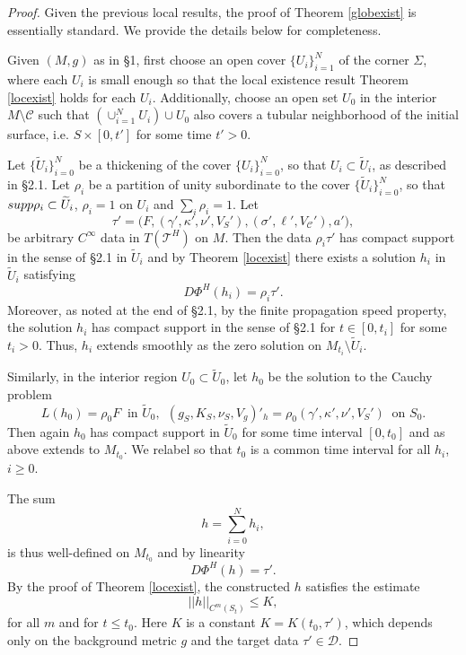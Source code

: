 \documentclass[10pt,a4paper]{amsart}
\newcommand{\Si}{\Sigma}
\newcommand{\be}{\begin{equation}}
\newcommand{\cC}{{\mathcal C}}
\newcommand{\cD}{{\mathcal D}}
\newcommand{\cT}{{\mathcal T}}
\newcommand{\ee}{\end{equation}}
\newcommand{\g}{\gamma}
\renewcommand{\k}{\kappa}
\newcommand{\s}{\sigma}
\newcommand{\w}{\widetilde}
\begin{document}
 \begin{proof}

  Given the previous local results, the proof of Theorem \ref{globexist} is essentially standard. We provide the details below for completeness. 
    
  Given $(M, g)$ as in \S 1, first choose an open cover $\{U_i\}_{i=1}^N$ of the corner $\Si$, where each $U_i$ is small enough so that the local 
existence result Theorem \ref{locexist} holds for each $U_i$. Additionally, choose an open set $U_0$ in the interior $M\setminus \cC$ such that 
$(\cup_{i=1}^N U_i)\cup U_0$ also covers a tubular neighborhood of the initial surface, i.e. $S\times [0,t']$ for some time $t'>0$.

Let $\{\w U_i\}_{i=0}^N$ be a thickening of the cover $\{U_i\}_{i=0}^N$, so that $U_i \subset \w U_i$, as described in \S 2.1. Let 
$\rho_i$ be a partition of unity subordinate to the cover $\{\w U_i\}_{i=0}^N$, so that ${\rm supp}\rho_i\subset \w U_i$, $\rho_i = 1$ on 
$U_i$ and  $\sum_i \rho_i=1$. Let 
$$\tau' =\big(F, (\g', \k', \nu', V_S'), (\s', \ell',V_{\cC}'), a' \big),$$
be arbitrary $C^{\infty}$ data in $T(\cT^H)$ on $M$. Then the data $\rho_i \tau'$ has compact support in the sense of \S 2.1 in $\w U_i$ 
and by Theorem \ref{locexist} there exists a solution $h_i$ in $\w U_i$ satisfying 
$$D\Phi^H(h_i) = \rho_i \tau'.$$ 
Moreover, as noted at the end of \S 2.1, by the finite propagation speed property, the solution $h_i$ has compact support in the sense of \S 2.1 for 
$t \in [0,t_i]$ for some $t_i > 0$. Thus, $h_i$ extends smoothly as the zero solution on $M_{t_i} \setminus \w U_i$. 

   Similarly, in the interior region $U_0 \subset \w U_0$, let $h_0$ be the solution to the Cauchy problem 
$$L(h_0) = \rho_0 F \ \mbox{ in } \w U_0, \ \ (g_S, K_S, \nu_S, V_g)'_h = \rho_0(\g', \k', \nu', V_S') \ \mbox{ on }S_0.$$
Then again $h_0$ has compact support in $\w U_0$ for some time interval $[0, t_0]$ and as above extends to $M_{t_0}$. We relabel so that 
$t_0$ is a common time interval for all $h_i$, $i \geq 0$. 

  The sum 
$$h = \sum_{i=0}^N h_i,$$
is thus well-defined on $M_{t_0}$ and by linearity
$$D\Phi^H(h) = \tau'.$$ 
By the proof of Theorem \ref{locexist}, the constructed $h$ satisfies the estimate
\be \label{enest2}
||h||_{C^{m}(S_t)} \leq K,
\ee
for all $m$ and for $t \leq t_0$. Here $K$ is a constant $K = K(t_0, \tau')$, which depends only on the background metric $g$ and the 
target data $\tau' \in \cD$. 


\end{proof}
\end{document}
